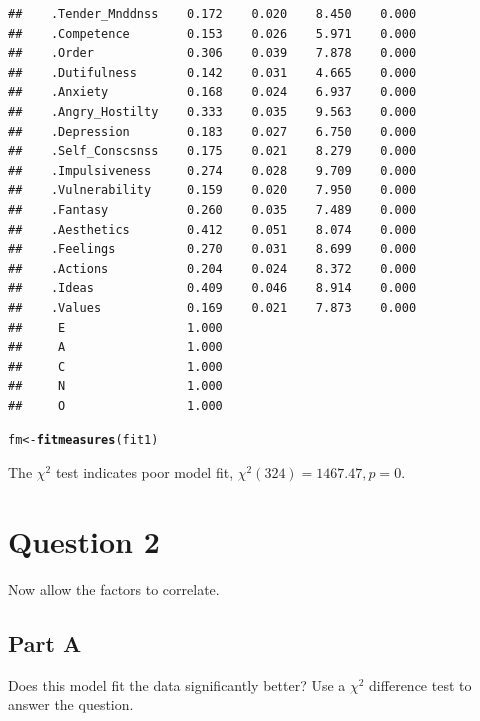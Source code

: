 \documentclass{article}\usepackage[]{graphicx}\usepackage[]{color}
\makeatletter
\newcommand{\hlstd}[1]{\textcolor[rgb]{0.345,0.345,0.345}{#1}}%
\newcommand{\hlkwb}[1]{\textcolor[rgb]{0.69,0.353,0.396}{#1}}%
\newcommand{\hlkwd}[1]{\textcolor[rgb]{0.737,0.353,0.396}{\textbf{#1}}}%
\newenvironment{kframe}{%
 \def\at@end@of@kframe{}%
 \ifinner\ifhmode%
  \def\at@end@of@kframe{\end{minipage}}%
  \begin{minipage}{\columnwidth}%
 \fi\fi%
 \def\FrameCommand##1{\hskip\@totalleftmargin \hskip-\fboxsep
 \colorbox{shadecolor}{##1}\hskip-\fboxsep
     \hskip-\linewidth \hskip-\@totalleftmargin \hskip\columnwidth}%
 \MakeFramed {\advance\hsize-\width
   \@totalleftmargin\z@ \linewidth\hsize
   \@setminipage}}%
 {\par\unskip\endMakeFramed%
 \at@end@of@kframe}
\newenvironment{knitrout}{}{} %
\makeatother
\begin{document}
\begin{knitrout}
\begin{kframe}
\begin{verbatim}
##    .Tender_Mnddnss    0.172    0.020    8.450    0.000
##    .Competence        0.153    0.026    5.971    0.000
##    .Order             0.306    0.039    7.878    0.000
##    .Dutifulness       0.142    0.031    4.665    0.000
##    .Anxiety           0.168    0.024    6.937    0.000
##    .Angry_Hostilty    0.333    0.035    9.563    0.000
##    .Depression        0.183    0.027    6.750    0.000
##    .Self_Conscsnss    0.175    0.021    8.279    0.000
##    .Impulsiveness     0.274    0.028    9.709    0.000
##    .Vulnerability     0.159    0.020    7.950    0.000
##    .Fantasy           0.260    0.035    7.489    0.000
##    .Aesthetics        0.412    0.051    8.074    0.000
##    .Feelings          0.270    0.031    8.699    0.000
##    .Actions           0.204    0.024    8.372    0.000
##    .Ideas             0.409    0.046    8.914    0.000
##    .Values            0.169    0.021    7.873    0.000
##     E                 1.000                           
##     A                 1.000                           
##     C                 1.000                           
##     N                 1.000                           
##     O                 1.000
\end{verbatim}
\begin{alltt}
\hlstd{fm} \hlkwb{<-} \hlkwd{fitmeasures}\hlstd{(fit1)}
\end{alltt}
\end{kframe}
\end{knitrout}

The $\chi^2$ test indicates poor model fit, $\chi^2(324) = 1467.47, p = 0$. 


\section{Question 2}
Now allow the factors to correlate.  

\subsection{Part A}
Does this model fit the data significantly better? Use a $\chi^2$ difference test to answer the question.
\end{document}
